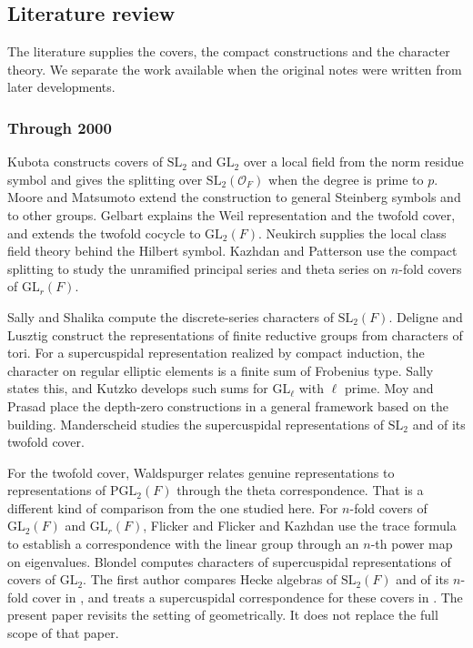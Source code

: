 \documentclass[12pt,letterpaper]{article}
\numberwithin{equation}{section}
\theoremstyle{definition}
\theoremstyle{remark}
\newcommand{\OO}{\mathcal O_F}
\begin{document}
\subsection*{Literature review}
The literature supplies the covers, the compact constructions and the character theory. We separate the work available when the original notes were written from later developments.

\subsubsection*{Through 2000}
Kubota \cite{Ku67} constructs covers of $\mathrm{SL}_2$ and $\mathrm{GL}_2$ over a local field from the norm residue symbol and gives the splitting over $\mathrm{SL}_2(\OO)$ when the degree is prime to $p$. Moore \cite{Mo68} and Matsumoto \cite{Ma69} extend the construction to general Steinberg symbols and to other groups. Gelbart \cite{Ge76} explains the Weil representation and the twofold cover, and extends the twofold cocycle to $\mathrm{GL}_2(F)$. Neukirch \cite{Ne86} supplies the local class field theory behind the Hilbert symbol. Kazhdan and Patterson \cite{KP84} use the compact splitting to study the unramified principal series and theta series on $n$-fold covers of $\mathrm{GL}_r(F)$.

Sally and Shalika \cite{SS68} compute the discrete-series characters of $\mathrm{SL}_2(F)$. Deligne and Lusztig \cite{DL76} construct the representations of finite reductive groups from characters of tori. For a supercuspidal representation realized by compact induction, the character on regular elliptic elements is a finite sum of Frobenius type. Sally \cite{Sa88} states this, and Kutzko \cite{Ku87} develops such sums for $\mathrm{GL}_\ell$ with $\ell$ prime. Moy and Prasad \cite{MP94,MP96} place the depth-zero constructions in a general framework based on the building. Manderscheid \cite{Ma84a,Ma84b} studies the supercuspidal representations of $\mathrm{SL}_2$ and of its twofold cover.

For the twofold cover, Waldspurger \cite{Wa80,Wa91} relates genuine representations to representations of $\mathrm{PGL}_2(F)$ through the theta correspondence. That is a different kind of comparison from the one studied here. For $n$-fold covers of $\mathrm{GL}_2(F)$ and $\mathrm{GL}_r(F)$, Flicker \cite{Fl80} and Flicker and Kazhdan \cite{FK86} use the trace formula to establish a correspondence with the linear group through an $n$-th power map on eigenvalues. Blondel \cite{Bl85} computes characters of supercuspidal representations of covers of $\mathrm{GL}_2$. The first author compares Hecke algebras of $\mathrm{SL}_2(F)$ and of its $n$-fold cover in \cite{Jo98}, and treats a supercuspidal correspondence for these covers in \cite{Jo99}. The present paper revisits the setting of \cite{Jo99} geometrically. It does not replace the full scope of that paper.
\end{document}
